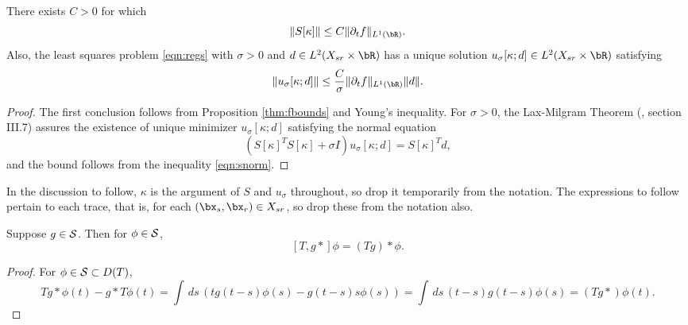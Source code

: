 \begin{prop}
  \label{thm:unorm}
  There exists $C>0$ for which
  \begin{equation}
    \label{eqn:snorm}
    \|S[\kappa]\| \le C\|\partial_t f\|_{L^1(\bR)}.
  \end{equation}
  Also, the least squares problem \ref{eqn:regs} with $\sigma > 0$ and
  $d\in L^2(X_{sr} \times \bR)$ has a unique solution
  $u_{\sigma}[\kappa;d] \in L^2(X_{sr} \times \bR)$ satisfying
  \begin{equation}
    \label{eqn:unorm}
    \|u_{\sigma}[\kappa;d]\| \le \frac{C}{\sigma}\|\partial_t f\|_{L^1(\bR)}\|d\|.
  \end{equation}
\end{prop}
\begin{proof}
  The first conclusion follows from Proposition \ref{thm:fbounds} and
  Young's inequality. For $\sigma > 0$, the Lax-Milgram Theorem
  (\cite{Yosida}, section III.7) assures the existence of unique
  minimizer $u_{\sigma}[\kappa;d]$ satisfying the normal equation
\begin{equation}
  \label{eqn:normal}
  (S[\kappa]^TS[\kappa] + \sigma I) u_{\sigma}[\kappa;d] = S[\kappa]^Td,
\end{equation}
and the bound follows from the inequality \ref{eqn:snorm}.
\end{proof}

In the discussion to follow, $\kappa$ is the argument of $S$ and
$u_{\sigma}$ throughout, so drop it temporarily from the notation. The
expressions to follow pertain to each trace, that is, for each
$(\bx_s,\bx_r) \in X_{sr}$, so drop these from the notation also.

\begin{lemma}
  \label{thm:tcomm}
  Suppose $g \in {\cal S}$. Then for $\phi \in {\cal S}$,
  \[
    [T, g*] \phi= (Tg)*\phi.
  \]
\end{lemma}
\begin{proof}
  For $\phi \in {\cal S} \subset D(T)$,
  \[
    T g*\phi (t) - g* T\phi(t) = \int\,ds \, (t g(t-s)\phi(s) -
    g(t-s)s\phi(s)) = \int\, ds \, (t-s)g(t-s)\phi(s) = (Tg *) \phi
    (t).
  \]
\end{proof}

